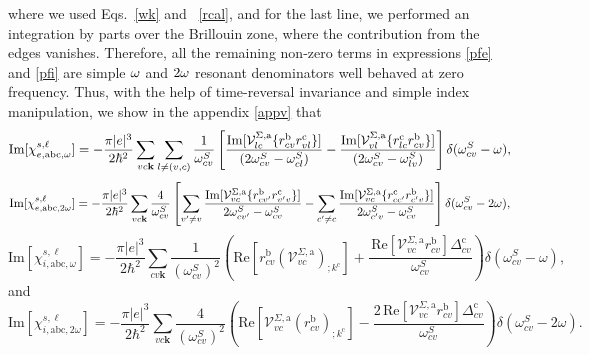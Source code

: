 \documentclass{article}
\begin{document}
where we used Eqs.~\eqref{wk} and ~\eqref{rcal}, and for the last
line, we performed an
integration by parts over the Brillouin zone,
where the contribution from the edges vanishes.\cite{ashcroft_solid_1976}
Therefore, all the remaining non-zero terms in expressions \eqref{pfe}
and \eqref{pfi} 
are simple $\omega$ and $2\omega$ resonant denominators well behaved at zero
frequency. 
Thus, with the help of
time-reversal invariance and simple index manipulation, we show
in the appendix \ref{appv} that
\begin{equation}\label{calvimchiewn}
\mathrm{Im}[\chi_{e,\mathrm{a}\mathrm{b}\mathrm{c},\omega}^{s,\ell}] =
-\frac{\pi |e|^3}{2\hbar^2}\sum_{vc\mathbf{k}}\sum_{l\neq(v,c)}\frac{1}{\omega^{S}_{cv}}
\left[
\frac{\mathrm{Im}[\mathcal{V}^{\Sigma,\text{a}}_{lc}\{r^{\mathrm{b}}_{cv}r^{\mathrm{c}}_{vl}\}]}{(2\omega^S_{cv}-\omega^S_{cl})}
-\frac{\mathrm{Im}[\mathcal{V}^{\Sigma,\text{a}}_{vl}\{r^{\mathrm{c}}_{lc}r^{\mathrm{b}}_{cv}\}]}{(2\omega^S_{cv}-\omega^S_{lv})}
\right]\delta(\omega^S_{cv}-\omega),
\end{equation}  
\begin{equation}\label{calvimchie2wn}
\mathrm{Im}[\chi_{e,\mathrm{a}\mathrm{b}\mathrm{c},2\omega}^{s,\ell}] =
-\frac{\pi |e|^3}{2\hbar^2}\sum_{vc\mathbf{k}}\frac{4}{\omega^{S}_{cv}}
\left[
\sum_{v'\ne v}\frac{\mathrm{Im}[\mathcal{V}^{\Sigma,\text{a}}_{vc}\{r^{\mathrm{b}}_{cv'}r^{\mathrm{c}}_{v'v}\}]}{2\omega^S_{cv'}-\omega^S_{cv}}
- \sum_{c'\ne c}\frac{\mathrm{Im}[\mathcal{V}^{\Sigma,\text{a}}_{vc}\{r^{\mathrm{c}}_{cc'}r^{\mathrm{b}}_{c'v}\}]}{2\omega^S_{c'v}-\omega^S_{cv}}
\right]\delta(\omega^S_{cv}-2\omega),
\end{equation}
\begin{equation}\label{calvimchiwn}
\mathrm{Im}[\chi_{i,\text{a}\text{b}\text{c},\omega}^{s,\ell}]
= -\frac{\pi\vert e\vert^3}{2\hbar^2}\sum_{cv\mathbf{k}}\frac{1}{(\omega^{S}_{cv})^{2}}
\left(
\mathrm{Re}\left[r^{\text{b}}_{cv}\left(\mathcal{V}^{\Sigma,\text{a}}_{vc}\right)_{;k^{\text{c}}}\right]
+\frac{\,\mathrm{Re}\left[\mathcal{V}^{\Sigma,\text{a}}_{vc}r^{\text{b}}_{cv}\right]\Delta^{\text{c}}_{cv}}{\omega^{S}_{cv}} 
\right)\delta(\omega^{S}_{cv}-\omega),
\end{equation}
and
\begin{equation}\label{calvimchi2wn}
\mathrm{Im}[\chi_{i,\text{a}\text{b}\text{c},2\omega}^{s,\ell}] = -\frac{\pi \vert e\vert^{3}}{2\hbar^2}\sum_{vc\mathbf{k}}\frac{4}{(\omega^{S}_{cv})^{2}}\left(\mathrm{Re}\left[\mathcal{V}^{\Sigma,\text{a}}_{vc}\left(r^{\text{b}}_{cv}\right)_{;k^{\text{c}}}\right] - \frac{2\,\mathrm{Re}\left[\mathcal{V}^{\Sigma,\text{a}}_{vc}r^{\text{b}}_{cv}\right]\Delta^{\text{c}}_{cv}}{\omega^{S}_{cv}}\right)\delta(\omega^{S}_{cv}-2\omega).
\end{equation}
\end{document}
